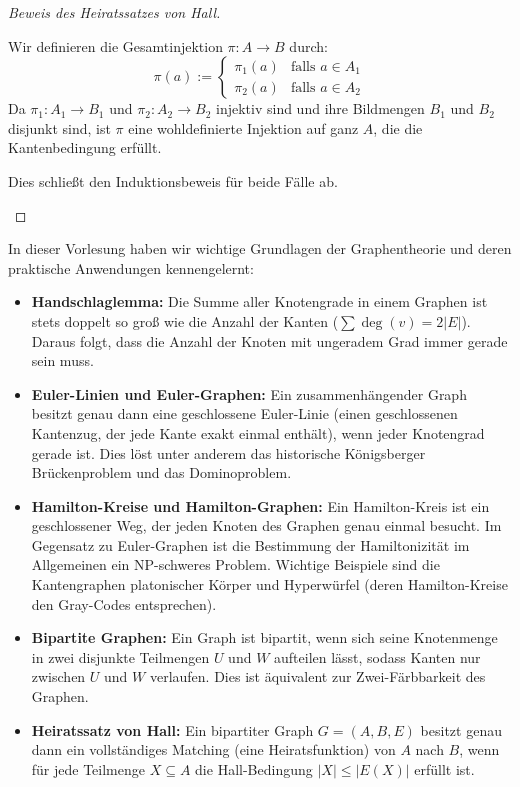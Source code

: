 \begin{proof}[Beweis des Heiratssatzes von Hall]
\begin{math-stroke}
\begin{enumerate}[label=\textbf{(\arabic*)}]
    Wir definieren die Gesamtinjektion $\pi \colon A \to B$ durch:
    \[
    \pi(a) := \begin{cases}
    \pi_1(a) & \text{falls } a \in A_1 \\
    \pi_2(a) & \text{falls } a \in A_2
    \end{cases}
    \]
    Da $\pi_1 \colon A_1 \to B_1$ und $\pi_2 \colon A_2 \to B_2$ injektiv sind und ihre Bildmengen $B_1$ und $B_2$ disjunkt sind, ist $\pi$ eine wohldefinierte Injektion auf ganz $A$, die die Kantenbedingung erfüllt.
\end{enumerate}
Dies schließt den Induktionsbeweis für beide Fälle ab.
\end{math-stroke}
\end{proof}

\begin{nice-box}
In dieser Vorlesung haben wir wichtige Grundlagen der Graphentheorie und deren praktische Anwendungen kennengelernt:
\begin{itemize}
    \item \textbf{Handschlaglemma:} Die Summe aller Knotengrade in einem Graphen ist stets doppelt so groß wie die Anzahl der Kanten ($\sum \deg(v) = 2|E|$). Daraus folgt, dass die Anzahl der Knoten mit ungeradem Grad immer gerade sein muss.
    \item \textbf{Euler-Linien und Euler-Graphen:} Ein zusammenhängender Graph besitzt genau dann eine geschlossene Euler-Linie (einen geschlossenen Kantenzug, der jede Kante exakt einmal enthält), wenn jeder Knotengrad gerade ist. Dies löst unter anderem das historische Königsberger Brückenproblem und das Dominoproblem.
    \item \textbf{Hamilton-Kreise und Hamilton-Graphen:} Ein Hamilton-Kreis ist ein geschlossener Weg, der jeden Knoten des Graphen genau einmal besucht. Im Gegensatz zu Euler-Graphen ist die Bestimmung der Hamiltonizität im Allgemeinen ein NP-schweres Problem. Wichtige Beispiele sind die Kantengraphen platonischer Körper und Hyperwürfel (deren Hamilton-Kreise den Gray-Codes entsprechen).
    \item \textbf{Bipartite Graphen:} Ein Graph ist bipartit, wenn sich seine Knotenmenge in zwei disjunkte Teilmengen $U$ und $W$ aufteilen lässt, sodass Kanten nur zwischen $U$ und $W$ verlaufen. Dies ist äquivalent zur Zwei-Färbbarkeit des Graphen.
    \item \textbf{Heiratssatz von Hall:} Ein bipartiter Graph $G = (A, B, E)$ besitzt genau dann ein vollständiges Matching (eine Heiratsfunktion) von $A$ nach $B$, wenn für jede Teilmenge $X \subseteq A$ die Hall-Bedingung $|X| \le |E(X)|$ erfüllt ist.
\end{itemize}
\end{nice-box}